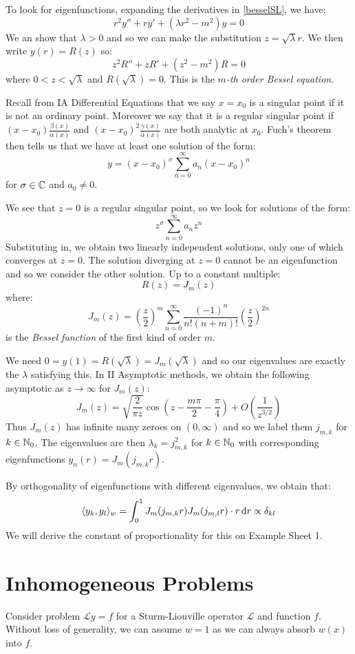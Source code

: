 \documentclass[../main.tex]{subfiles}
\begin{document}
To look for eigenfunctions, expanding the derivatives in \cref{besselSL}, we have:
\[
  r^2 y'' + ry' + (\lambda r^2 - m^2)y = 0
\]
We an show that $\lambda > 0$ and so we can make the substitution $z = \sqrt{\lambda} r$.
We then write $y(r) = R(z)$ so:
\[
  z^2 R'' + z R' + (z^2 - m^2) R = 0
\]
where $0 < z < \sqrt{\lambda}$ and $R(\sqrt{\lambda}) = 0$.
This is the \textit{$m$-th order Bessel equation}.
\begin{remark}[Recap]
  Recall from IA Differential Equations that we say $x = x_0$ is a singular point if it is not an ordinary point.
  Moreover we say that it is a regular singular point if $(x - x_0)\frac{\beta(x)}{\alpha(x)}$ and $(x - x_0)^2\frac{\gamma(x)}{\alpha(x)}$ are both analytic at $x_0$.
  Fuch's theorem then tells us that we have at least one solution of the form:
  \[
    y = (x - x_0)^{\sigma} \sum_{n = 0}^{\infty} a_n(x - x_0)^n
  \]
  for $\sigma \in \mathbb{C}$ and $a_0 \neq 0$.
\end{remark}
We see that $z = 0$ is a regular singular point, so we look for solutions of the form:
\[
  z^{\sigma} \sum_{n = 0}^{\infty} a_n z^n
\]
Substituting in, we obtain two linearly independent solutions, only one of which converges at $z = 0$.
The solution diverging at $z = 0$ cannot be an eigenfunction and so we consider the other solution.
Up to a constant multiple:
\[
  R(z) = J_m(z)
\]
where:
\[
  J_m(z) = \left(\frac{z}{2}\right)^m \sum_{n = 0}^{\infty} \frac{(-1)^n}{n! (n + m)!} \left(\frac{z}{2}\right)^{2n}
\]
is the \textit{Bessel function} of the first kind of order $m$.

We need $0 = y(1) = R(\sqrt{\lambda}) = J_m(\sqrt{\lambda})$ and so our eigenvalues are exactly the $\lambda$ satisfying this.
In II Asymptotic methods, we obtain the following asymptotic as $z \to \infty$ for $J_m(z)$:
\[
  J_m(z) = \sqrt{\frac{2}{\pi z}} \cos\left(z - \frac{m \pi}{2} - \frac{\pi}{4}\right) + O\left(\frac{1}{z^{3/2}}\right)
\]
Thus $J_m(z)$ has infinite many zeroes on $(0, \infty)$ and so we label them $j_{m, k}$ for $k \in \mathbb{N}_0$.
The eigenvalues are then $\lambda_k = j_{m, k}^2$ for $k \in \mathbb{N}_0$ with corresponding eigenfunctions $y_n(r) = J_m(j_{m, k} r)$.

By orthogonality of eigenfunctions with different eigenvalues, we obtain that:
\[
  \langle y_k, y_l \rangle_w = \int_{0}^{1} J_m(j_{m, k} r)J_m(j_{m, l} r) \cdot r \d{r} \propto \delta_{k l}
\]
We will derive the constant of proportionality for this on Example Sheet 1.
\section{Inhomogeneous Problems}
Consider problem $\mathcal{L} y = f$ for a Sturm-Liouville operator $\mathcal{L}$ and function $f$.
Without loss of generality, we can assume $w = 1$ as we can always absorb $w(x)$ into $f$.
\end{document}
